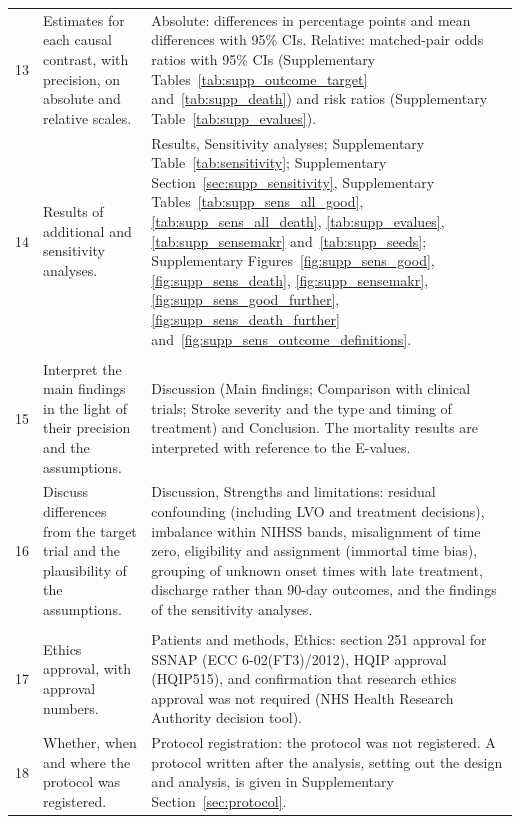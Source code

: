 {\begin{longtable}{p{1.0cm} p{4.6cm} p{10.4cm}}
13 & Estimates for each causal contrast, with precision, on absolute and relative scales. & Absolute: differences in percentage points and mean differences with 95\% CIs. Relative: matched-pair odds ratios with 95\% CIs (Supplementary Tables~\ref{tab:supp_outcome_target} and~\ref{tab:supp_death}) and risk ratios (Supplementary Table~\ref{tab:supp_evalues}). \\
14 & Results of additional and sensitivity analyses. & Results, Sensitivity analyses; Supplementary Table~\ref{tab:sensitivity}; Supplementary Section~\ref{sec:supp_sensitivity}, Supplementary Tables~\ref{tab:supp_sens_all_good}, \ref{tab:supp_sens_all_death}, \ref{tab:supp_evalues}, \ref{tab:supp_sensemakr} and~\ref{tab:supp_seeds}; Supplementary Figures~\ref{fig:supp_sens_good}, \ref{fig:supp_sens_death}, \ref{fig:supp_sensemakr}, \ref{fig:supp_sens_good_further}, \ref{fig:supp_sens_death_further} and~\ref{fig:supp_sens_outcome_definitions}. \\
\addlinespace
\multicolumn{3}{l}{\textbf{Discussion}}\\
15 & Interpret the main findings in the light of their precision and the assumptions. & Discussion (Main findings; Comparison with clinical trials; Stroke severity and the type and timing of treatment) and Conclusion. The mortality results are interpreted with reference to the E-values. \\
16 & Discuss differences from the target trial and the plausibility of the assumptions. & Discussion, Strengths and limitations: residual confounding (including LVO and treatment decisions), imbalance within NIHSS bands, misalignment of time zero, eligibility and assignment (immortal time bias), grouping of unknown onset times with late treatment, discharge rather than 90-day outcomes, and the findings of the sensitivity analyses. \\
\addlinespace
\multicolumn{3}{l}{\textbf{Other information}}\\
17 & Ethics approval, with approval numbers. & Patients and methods, Ethics: section 251 approval for SSNAP (ECC 6-02(FT3)/2012), HQIP approval (HQIP515), and confirmation that research ethics approval was not required (NHS Health Research Authority decision tool). \\
18 & Whether, when and where the protocol was registered. & Protocol registration: the protocol was not registered. A protocol written after the analysis, setting out the design and analysis, is given in Supplementary Section~\ref{sec:protocol}. \\

\end{longtable}}
